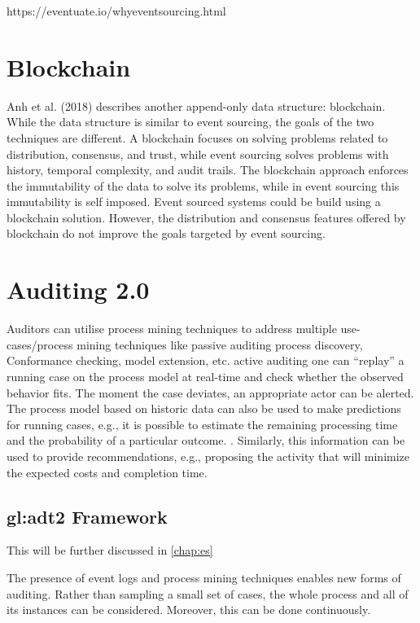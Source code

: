 https://eventuate.io/whyeventsourcing.html

\section{Blockchain}

Anh et al. (2018) describes another append-only data structure: blockchain. While the data structure is similar to event sourcing, the goals of the two techniques are different. A blockchain focuses on solving problems related to distribution, consensus, and trust, while event sourcing solves problems with history, temporal complexity, and audit trails. The blockchain approach enforces the immutability of the data to solve its problems, while in event sourcing this immutability is self imposed. Event sourced systems could be build using a blockchain solution. However, the distribution and consensus features offered by blockchain do not improve the goals targeted by event sourcing.

\section{Auditing 2.0}

Auditors can utilise process mining techniques to address multiple use-cases/process mining techniques like 
passive auditing
process discovery, Conformance checking, model extension, etc.
active auditing
one can “replay” a running
case on the process model at real-time and check whether the observed behavior fits. The moment the
case deviates, an appropriate actor can be alerted. The process model based on historic data can also be
used to make predictions for running cases, e.g., it is possible to estimate the remaining processing time
and the probability of a particular outcome. . Similarly, this information can be used to provide
recommendations, e.g., proposing the activity that will minimize the expected costs and completion
time.

\subsection{\gls{gl:adt2} Framework}

This will be further discussed in \ref{chap:es}

The presence of event logs and process mining techniques enables new forms of auditing. Rather than
sampling a small set of cases, the whole process and all of its instances can be considered. Moreover,
this can be done continuously.

